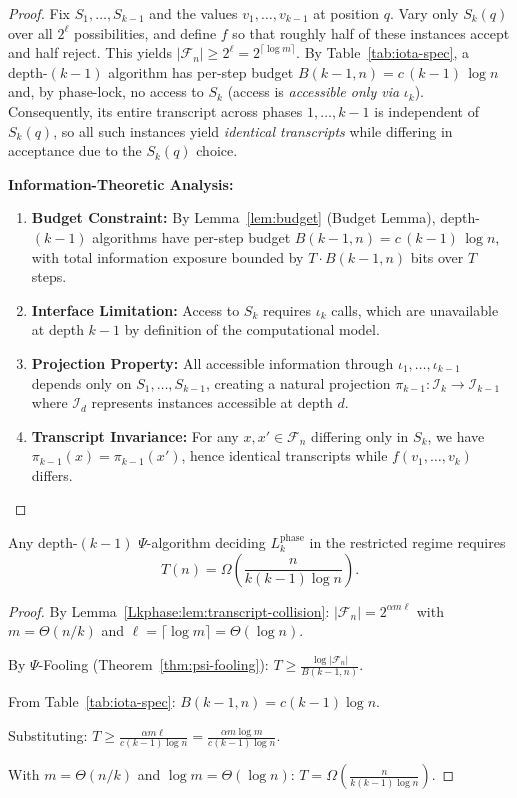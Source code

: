\begin{proof}
Fix $S_1,\ldots,S_{k-1}$ and the values $v_1,\ldots,v_{k-1}$ at position $q$. Vary only $S_k(q)$ over all $2^{\ell}$ possibilities, and define $f$ so that roughly half of these instances accept and half reject. This yields $\lvert\mathcal{F}_n\rvert\ge 2^{\ell}=2^{\lceil\log m\rceil}$. By Table~\ref{tab:iota-spec}, a depth-$(k{-}1)$ algorithm has per-step budget $B(k{-}1,n)=c\,(k{-}1)\,\log n$ and, by phase-lock, no access to $S_k$ (access is \emph{accessible only via} $\iota_k$). Consequently, its entire transcript across phases $1,\ldots,k{-}1$ is independent of $S_k(q)$, so all such instances yield \emph{identical transcripts} while differing in acceptance due to the $S_k(q)$ choice.

\textbf{Information-Theoretic Analysis:}
\begin{enumerate}
\item \textbf{Budget Constraint:} By Lemma~\ref{lem:budget} (Budget Lemma), depth-$(k{-}1)$ algorithms have per-step budget $B(k{-}1,n) = c\,(k{-}1)\,\log n$, with total information exposure bounded by $T \cdot B(k{-}1,n)$ bits over $T$ steps.
\item \textbf{Interface Limitation:} Access to $S_k$ requires $\iota_k$ calls, which are unavailable at depth $k{-}1$ by definition of the computational model.
\item \textbf{Projection Property:} All accessible information through $\iota_1,\ldots,\iota_{k-1}$ depends only on $S_1,\ldots,S_{k-1}$, creating a natural projection $\pi_{k-1}:\mathcal{I}_k\to\mathcal{I}_{k-1}$ where $\mathcal{I}_d$ represents instances accessible at depth $d$.
\item \textbf{Transcript Invariance:} For any $x,x'\in\mathcal{F}_n$ differing only in $S_k$, we have $\pi_{k-1}(x)=\pi_{k-1}(x')$, hence identical transcripts while $f(v_1,\ldots,v_k)$ differs.
\end{enumerate}
\end{proof}

\begin{theorem}[LB at depth $k{-}1$]
\label{Lkphase:thm:LB}
Any depth-$(k{-}1)$ $\Psi$-algorithm deciding $L_k^{\text{phase}}$ in the restricted regime requires
\[
T(n)=\Omega\!\left(\frac{n}{k(k{-}1)\log n}\right).
\]
\end{theorem}

\begin{proof}
By Lemma~\ref{Lkphase:lem:transcript-collision}: $|\mathcal{F}_n| = 2^{\alpha m \ell}$ with $m = \Theta(n/k)$ and $\ell = \lceil\log m\rceil = \Theta(\log n)$.

By \(\Psi\)-Fooling (Theorem~\ref{thm:psi-fooling}): $T \geq \frac{\log|\mathcal{F}_n|}{B(k-1,n)}$.

From Table~\ref{tab:iota-spec}: $B(k-1,n) = c(k-1)\log n$.

Substituting: $T \geq \frac{\alpha m \ell}{c(k-1)\log n} = \frac{\alpha m \log m}{c(k-1)\log n}$.

With $m = \Theta(n/k)$ and $\log m = \Theta(\log n)$: $T = \Omega\left(\frac{n}{k(k-1)\log n}\right)$.
\end{proof}

